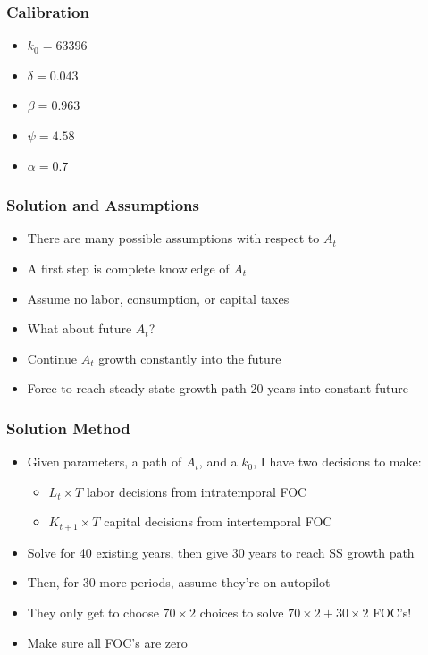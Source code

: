 \documentclass{beamer}
\begin{document}
\begin{frame}
\frametitle[alignment=center]{Calibration}
\begin{itemize}
\item $k_0=63396$
\bigskip
\item $\delta=0.043$
\bigskip
\item $\beta=0.963$
\bigskip
\item $\psi=4.58$
\bigskip
\item $\alpha=0.7$
\end{itemize}
\end{frame}

\begin{frame}
\frametitle[alignment=center]{Solution and Assumptions}
\begin{itemize}
\item There are many possible assumptions with respect to $A_t$
\bigskip
\item A first step is complete knowledge of $A_t$
\bigskip
\item Assume no labor, consumption, or capital taxes
\bigskip
\item What about future $A_t$?
\bigskip
\item Continue $A_t$ growth constantly into the future
\bigskip
\item Force to reach steady state growth path 20 years into constant future
\end{itemize}
\end{frame}

\begin{frame}
\frametitle[alignment=center]{Solution Method}
\begin{itemize}
\item Given parameters, a path of $A_t$, and a $k_0$, I have two decisions to make:
\bigskip
\begin{itemize}
\item $L_t\times T$ labor decisions from intratemporal FOC
\bigskip
\item $K_{t+1}\times T$ capital decisions from intertemporal FOC
\bigskip
\end{itemize} 
\item Solve for 40 existing years, then give 30 years to reach SS growth path
\bigskip
\item Then, for 30 more periods, assume they're on autopilot
\bigskip
\item They only get to choose $70\times 2$ choices to solve $70\times2+30\times2$ FOC's!
\bigskip
\item Make sure all FOC's are zero
\end{itemize}
\end{frame}
\end{document}
